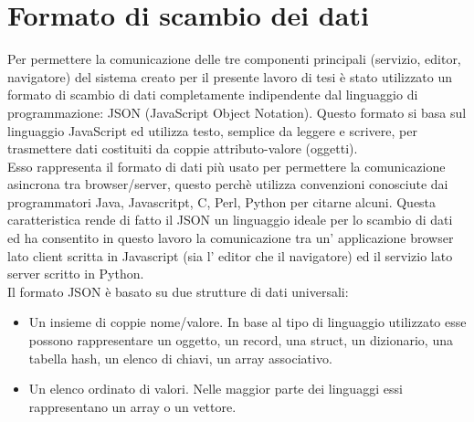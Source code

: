 \section{Formato di scambio dei dati}
\label{sec:chapter_architettura_sistema_formato_scambio}

Per permettere la comunicazione delle  tre componenti principali (servizio, editor, navigatore) del sistema creato per il presente lavoro di tesi è stato utilizzato un formato di scambio di dati completamente indipendente dal linguaggio di programmazione: JSON (JavaScript Object Notation).
Questo formato si basa sul linguaggio JavaScript ed utilizza testo, semplice da leggere e scrivere, per trasmettere dati costituiti da coppie attributo-valore (oggetti).
\\
Esso rappresenta il formato  di dati più usato per permettere la comunicazione asincrona tra browser/server, questo perchè utilizza convenzioni conosciute dai programmatori Java, Javascritpt, C, Perl, Python per citarne alcuni. Questa caratteristica rende di fatto il JSON un linguaggio ideale per lo scambio di dati ed ha consentito in questo lavoro la comunicazione tra un’ applicazione browser lato client scritta in Javascript (sia l’ editor che il navigatore) ed il servizio lato server scritto in Python.
\\
Il formato JSON è basato su due strutture di dati universali:
\begin{itemize}
\item Un insieme di coppie nome/valore. In base al tipo di linguaggio utilizzato esse possono rappresentare un oggetto, un record, una struct, un dizionario, una tabella hash, un elenco di chiavi, un array associativo.
\item Un elenco ordinato di valori. Nelle maggior parte dei linguaggi essi rappresentano un array o un vettore.
\end{itemize}

